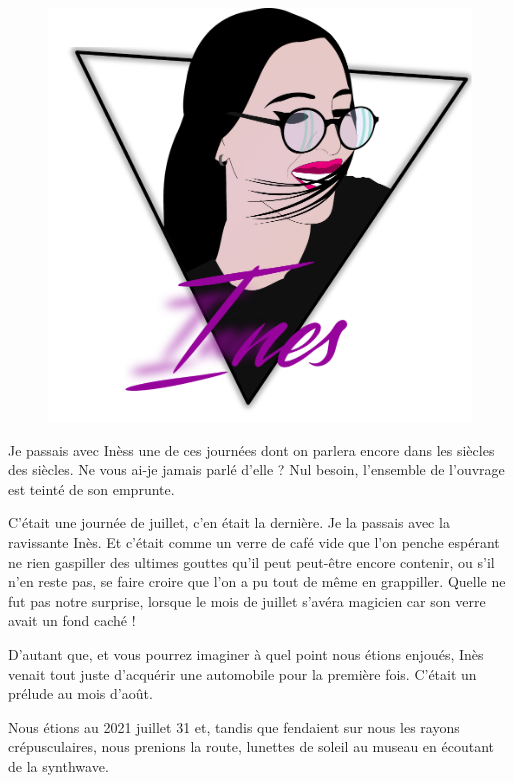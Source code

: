\begin{figure}[h]
  \centering
  \includegraphics[width=\textwidth]{img/ines-syntwave.pdf}
  \captionsetup{labelformat=empty}
  \caption[Portrait synthwave d’Inèss]{}
\end{figure}

\begin{prose}
  Je passais avec Inèss une de ces journées dont on parlera encore dans les siècles des siècles. Ne vous ai-je jamais parlé d’elle ? Nul besoin, l’ensemble de l’ouvrage est teinté de son emprunte.

  C’était une journée de juillet, c’en était la dernière. Je la passais avec la ravissante Inès. Et c’était comme un verre de café vide que l’on penche espérant ne rien gaspiller des ultimes gouttes qu’il peut peut-être encore contenir, ou s’il n’en reste pas, se faire croire que l’on a pu tout de même en grappiller.
  Quelle ne fut pas notre surprise, lorsque le mois de juillet s’avéra magicien car son verre avait un fond caché !

  D’autant que, et vous pourrez imaginer à quel point nous étions enjoués, Inès venait tout juste d’acquérir une automobile pour la première fois. C’était un prélude au mois d’août.

  Nous étions au 2021 juillet 31 et, tandis que fendaient sur nous les rayons crépusculaires, nous prenions la route, lunettes de soleil au museau en écoutant de la synthwave.
\end{prose}

